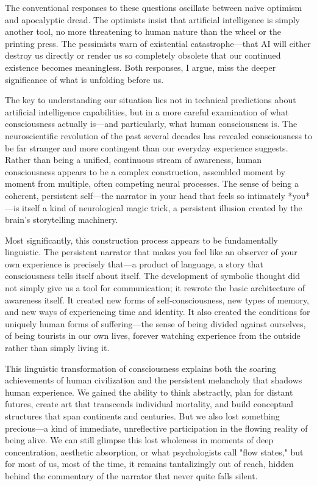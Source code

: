 \documentclass[12pt,letterpaper]{article}
\begin{document}
The conventional responses to these questions oscillate between naive optimism and apocalyptic dread. The optimists insist that artificial intelligence is simply another tool, no more threatening to human nature than the wheel or the printing press. The pessimists warn of existential catastrophe—that AI will either destroy us directly or render us so completely obsolete that our continued existence becomes meaningless. Both responses, I argue, miss the deeper significance of what is unfolding before us.

The key to understanding our situation lies not in technical predictions about artificial intelligence capabilities, but in a more careful examination of what consciousness actually is—and particularly, what human consciousness is. The neuroscientific revolution of the past several decades has revealed consciousness to be far stranger and more contingent than our everyday experience suggests. Rather than being a unified, continuous stream of awareness, human consciousness appears to be a complex construction, assembled moment by moment from multiple, often competing neural processes. The sense of being a coherent, persistent self—the narrator in your head that feels so intimately *you*—is itself a kind of neurological magic trick, a persistent illusion created by the brain's storytelling machinery.

Most significantly, this construction process appears to be fundamentally linguistic. The persistent narrator that makes you feel like an observer of your own experience is precisely that—a product of language, a story that consciousness tells itself about itself. The development of symbolic thought did not simply give us a tool for communication; it rewrote the basic architecture of awareness itself. It created new forms of self-consciousness, new types of memory, and new ways of experiencing time and identity. It also created the conditions for uniquely human forms of suffering—the sense of being divided against ourselves, of being tourists in our own lives, forever watching experience from the outside rather than simply living it.

This linguistic transformation of consciousness explains both the soaring achievements of human civilization and the persistent melancholy that shadows human experience. We gained the ability to think abstractly, plan for distant futures, create art that transcends individual mortality, and build conceptual structures that span continents and centuries. But we also lost something precious—a kind of immediate, unreflective participation in the flowing reality of being alive. We can still glimpse this lost wholeness in moments of deep concentration, aesthetic absorption, or what psychologists call "flow states," but for most of us, most of the time, it remains tantalizingly out of reach, hidden behind the commentary of the narrator that never quite falls silent.
\end{document}
